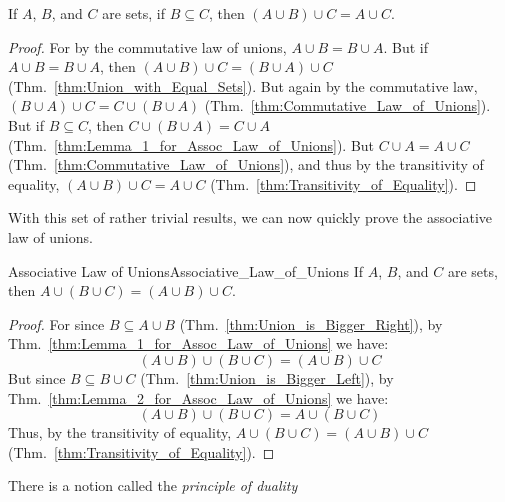         \begin{theorem}
            \label{thm:Lemma_2_for_Assoc_Law_of_Unions}%
            If $A$, $B$, and $C$ are sets, if $B\subseteq{C}$, then
            $(A\cup{B})\cup{C}=A\cup{C}$.
        \end{theorem}
        \begin{proof}
            For by the commutative law of unions,
            $A\cup{B}=B\cup{A}$. But if $A\cup{B}=B\cup{A}$, then
            $(A\cup{B})\cup{C}=(B\cup{A})\cup{C}$
            (Thm.~\ref{thm:Union_with_Equal_Sets}). But again by the commutative
            law, $(B\cup{A})\cup{C}=C\cup(B\cup{A})$
            (Thm.~\ref{thm:Commutative_Law_of_Unions}). But if
            $B\subseteq{C}$, then $C\cup(B\cup{A})=C\cup{A}$
            (Thm.~\ref{thm:Lemma_1_for_Assoc_Law_of_Unions}). But
            $C\cup{A}=A\cup{C}$ (Thm.~\ref{thm:Commutative_Law_of_Unions}),
            and thus by the transitivity of equality,
            $(A\cup{B})\cup{C}=A\cup{C}$
            (Thm.~\ref{thm:Transitivity_of_Equality}).
        \end{proof}
        With this set of rather trivial results, we can now quickly prove the
        associative law of unions.
        \begin{ltheorem}{Associative Law of Unions}{Associative_Law_of_Unions}
            If $A$, $B$, and $C$ are sets, then
            $A\cup(B\cup{C})=(A\cup{B})\cup{C}$.
        \end{ltheorem}
        \begin{proof}
            For since $B\subseteq{A}\cup{B}$
            (Thm.~\ref{thm:Union_is_Bigger_Right}), by
            Thm.~\ref{thm:Lemma_1_for_Assoc_Law_of_Unions} we have:
            \begin{equation}
                (A\cup{B})\cup(B\cup{C})=(A\cup{B})\cup{C}
            \end{equation}
            But since $B\subseteq{B}\cup{C}$
            (Thm.~\ref{thm:Union_is_Bigger_Left}),
            by Thm.~\ref{thm:Lemma_2_for_Assoc_Law_of_Unions} we have:
            \begin{equation}
                (A\cup{B})\cup(B\cup{C})=A\cup(B\cup{C})
            \end{equation}
            Thus, by the transitivity of equality,
            $A\cup(B\cup{C})=(A\cup{B})\cup{C}$
            (Thm.~\ref{thm:Transitivity_of_Equality}).
        \end{proof}
        There is a notion called the \textit{principle of duality}%
